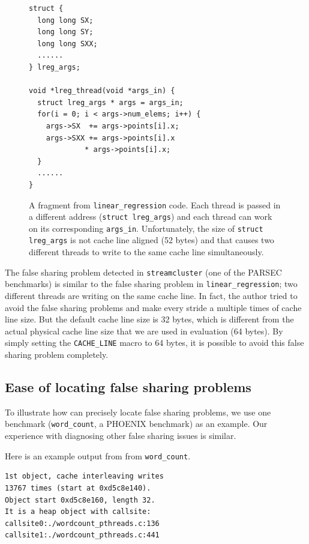 \begin{figure}[!t]
\begin{lstlisting}
struct {
  long long SX;
  long long SY;
  long long SXX;
  ......
} lreg_args;

void *lreg_thread(void *args_in) {
  struct lreg_args * args = args_in;
  for(i = 0; i < args->num_elems; i++) {
    args->SX  += args->points[i].x;
    args->SXX += args->points[i].x 
   	         * args->points[i].x;
  }
  ......	
}
\end{lstlisting}
\caption{A fragment from \texttt{linear\_regression} code. 
Each thread is passed in a different address (\texttt{struct lreg\_args}) and each thread can work on its corresponding \texttt{args\_in}. 
Unfortunately, the size of \texttt{struct lreg\_args} is not cache line aligned (52 bytes) and that
causes two different threads to write to the same cache line simultaneously. 
\label{fig:linear_regression}}
\end{figure}

The false sharing problem detected in \texttt{streamcluster} (one of the PARSEC benchmarks) is similar to the false sharing problem in \texttt{linear\_regression}; two different threads are writing on the same cache line.  In fact, the author tried to avoid the false sharing problems and make every stride a multiple times of cache line size. But the default cache line size is 32 bytes, which is different from the actual physical cache line size that we are used in evaluation (64 bytes).  By simply setting the \texttt{CACHE\_LINE} macro to 64 bytes, it is possible to avoid this false sharing problem completely.


\subsection{Ease of locating false sharing problems}

\noindent
To illustrate how \sheriffdetect{} can precisely locate false sharing problems, we 
use one benchmark (\texttt{word\_count}, a PHOENIX benchmark) as
an example. Our experience with diagnosing other false sharing issues is similar.

Here is an example output from \sheriffdetect{} from \texttt{word\_count}.

\begin{verbatim} 
1st object, cache interleaving writes 
13767 times (start at 0xd5c8e140). 
Object start 0xd5c8e160, length 32. 
It is a heap object with callsite:
callsite0:./wordcount_pthreads.c:136
callsite1:./wordcount_pthreads.c:441
\end{verbatim}

